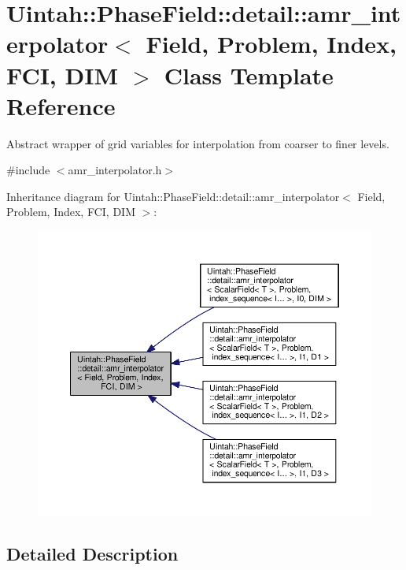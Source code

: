 \hypertarget{classUintah_1_1PhaseField_1_1detail_1_1amr__interpolator}{}\section{Uintah\+:\+:Phase\+Field\+:\+:detail\+:\+:amr\+\_\+interpolator$<$ Field, Problem, Index, F\+CI, D\+IM $>$ Class Template Reference}
\label{classUintah_1_1PhaseField_1_1detail_1_1amr__interpolator}


Abstract wrapper of grid variables for interpolation from coarser to finer levels.  




{\ttfamily \#include $<$amr\+\_\+interpolator.\+h$>$}



Inheritance diagram for Uintah\+:\+:Phase\+Field\+:\+:detail\+:\+:amr\+\_\+interpolator$<$ Field, Problem, Index, F\+CI, D\+IM $>$\+:\nopagebreak
\begin{figure}[H]
\begin{center}
\leavevmode
\includegraphics[width=350pt]{classUintah_1_1PhaseField_1_1detail_1_1amr__interpolator__inherit__graph}
\end{center}
\end{figure}


\subsection{Detailed Description}

